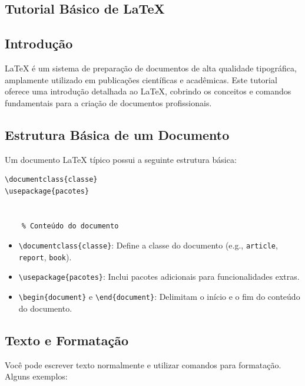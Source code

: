 \postextual




\begin{apendicesenv}

\chapter{Tutorial Básico de \LaTeX}

\section*{Introdução}
\LaTeX{} é um sistema de preparação de documentos de alta qualidade tipográfica, amplamente utilizado em publicações científicas e acadêmicas. Este tutorial oferece uma introdução detalhada ao \LaTeX, cobrindo os conceitos e comandos fundamentais para a criação de documentos profissionais.

\section*{Estrutura Básica de um Documento}
Um documento \LaTeX{} típico possui a seguinte estrutura básica:

\begin{verbatim}
\documentclass{classe}
\usepackage{pacotes}


    % Conteúdo do documento

\end{verbatim}

\begin{itemize}
    \item \texttt{\textbackslash documentclass\{classe\}}: Define a classe do documento (e.g., \texttt{article}, \texttt{report}, \texttt{book}).
    \item \texttt{\textbackslash usepackage\{pacotes\}}: Inclui pacotes adicionais para funcionalidades extras.
    \item \texttt{\textbackslash begin\{document\}} e \texttt{\textbackslash end\{document\}}: Delimitam o início e o fim do conteúdo do documento.
\end{itemize}

\section*{Texto e Formatação}
Você pode escrever texto normalmente e utilizar comandos para formatação. Alguns exemplos:


\end{apendicesenv}
